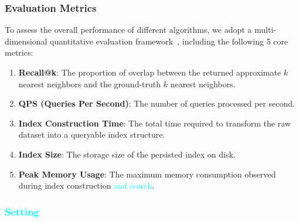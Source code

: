\documentclass[sigconf, nonacm]{acmart}
\begin{document}
	
	
	
	
	
	\subsubsection{Evaluation Metrics}
	
	To assess the overall performance of different algorithms, we adopt a multi-dimensional quantitative evaluation framework~\cite{compare}, including the following 5 core metrics:
	
	\begin{enumerate}
		
		\item \textbf{Recall@k}: The proportion of overlap between the returned approximate $k$ nearest neighbors and the ground-truth $k$ nearest neighbors.
		\item \textbf{QPS (Queries Per Second)}: The number of queries processed per second.
		\item \textbf{Index Construction Time}: The total time required to transform the raw dataset into a queryable index structure.
		\item \textbf{Index Size}: The storage size of the persisted index on disk.
		\item \textbf{Peak Memory Usage}: The maximum memory consumption observed during index construction \textcolor{cyan}{and search}.
	\end{enumerate}
	
	
	
	
	
	\subsubsection{\textcolor{cyan}{Setting}}
	
\end{document}
